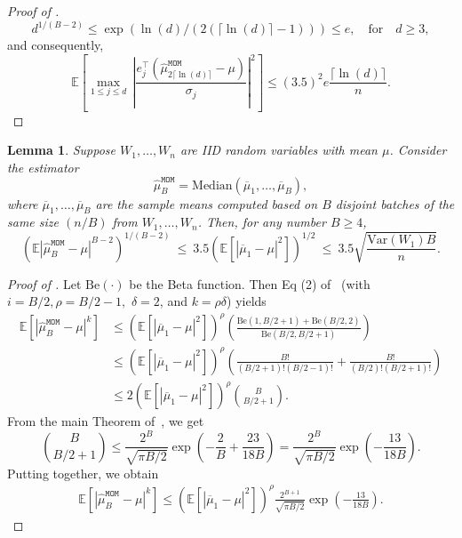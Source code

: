 \documentclass[12pt]{article}
\newtheorem{lemma}[theorem]{Lemma}
\begin{document}
\begin{appendices}
\begin{proof}[Proof of ]
    $$
    d^{1/(B - 2)} \le \exp(\ln(d)/(2(\lceil\ln(d)\rceil - 1))) \le e,\quad\mbox{for}\quad d\ge3,
    $$
    and consequently, 
    \[
    \mathbb{E}\left[\max_{1\le j\le d}\,\left|\frac{e_j^{\top}(\widehat{\mu}^{\mathtt{MOM}}_{2\lceil\ln(d)\rceil} - \mu)}{\sigma_j}\right|^2\right] \le (3.5)^2e\frac{\lceil\ln(d)\rceil}{n}.
    \]
\end{proof}
\begin{lemma}\label{thm:median-of-means-moment-version}
Suppose $W_1, \ldots, W_n$ are IID random variables with mean $\mu$. Consider the estimator
\[
\widehat{\mu}_B^{\mathtt{MOM}} = \mathrm{Median}(\overline{\mu}_1, \ldots, \overline{\mu}_B),
\]
where $\overline{\mu}_1, \ldots, \overline{\mu}_B$ are the sample means computed based on $B$ disjoint batches of the same size $(n/B)$ from $W_1, \ldots, W_n$. 
Then, for any number $B \ge 4$,
\[
\left(\mathbb{E}|\widehat{\mu}_B^{\mathtt{MOM}} - \mu|^{B - 2}\right)^{1/(B-2)} ~\le~ 3.5(\mathbb{E}[|\overline{\mu}_1 - \mu|^2])^{1/2} ~\le~ 3.5\sqrt{\frac{\mathrm{Var}(W_1)B}{n}}. 
\]
\end{lemma}
\begin{proof}[Proof of ]
Let $\mathrm{Be}(\cdot)$ be the Beta function.  Then Eq (2) of~\cite{gribkova1995bounds} (with $i = B/2, \rho = B/2 - 1,$ $\delta = 2$, and $k = \rho\delta$) yields
    \begin{equation}\label{eq:moment-order-statistic}
    \begin{split}
    \mathbb{E}[|\widehat{\mu}_B^{\mathtt{MOM}} - \mu|^k] &\le (\mathbb{E}[|\overline{\mu}_1 - \mu|^2])^{\rho}\left(\frac{\text{Be}(1, B/2 + 1) + \text{Be}(B/2, 2)}{\text{Be}(B/2, B/2 + 1)}\right)\\
    &\le (\mathbb{E}[|\overline{\mu}_1 - \mu|^2])^{\rho}\left(\frac{B!}{(B/2 + 1)!(B/2 - 1)!} + \frac{B!}{(B/2)!(B/2 + 1)!}\right)\\
    &\le 2(\mathbb{E}[|\overline{\mu}_1 - \mu|^2])^{\rho}\binom{B}{B/2 + 1}.
    \end{split}
    \end{equation}
    From the main Theorem of~\cite{agievich2022upper}, we get
    \[
    \binom{B}{B/2 + 1} \le \frac{2^B}{\sqrt{\pi B/2}}\exp\left(-\frac{2}{B} + \frac{23}{18B}\right) = \frac{2^B}{\sqrt{\pi B/2}}\exp\left(-\frac{13}{18B}\right).
    \]
    Putting together, we obtain 
    \begin{align*}
        \mathbb{E}[|\widehat{\mu}_B^{\mathtt{MOM}} - \mu|^k]  \le (\mathbb{E}[|\overline{\mu}_1 - \mu|^2])^{\rho}\frac{2^{B+1}}{\sqrt{\pi B/2}}\exp\left(-\frac{13}{18B}\right).

\end{align*}
\end{proof}
\end{appendices}
\end{document}
